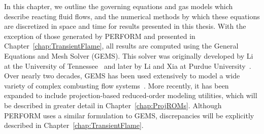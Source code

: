 
In this chapter, we outline the governing equations and gas models which describe reacting fluid flows, and the numerical methods by which these equations are discretized in space and time for results presented in this thesis. With the exception of those generated by PERFORM and presented in Chapter~\ref{chap:TransientFlame}, all results are computed using the General Equations and Mesh Solver (GEMS). This solver was originally developed by Li at the University of Tennessee~\cite{Li2001} and later by Li and Xia at Purdue University~\cite{Li2006}. Over nearly two decades, GEMS has been used extensively to model a wide variety of complex combusting flow systems~\cite{Xia2011,Huang2014,Comer2016}. More recently, it has been expanded to include projection-based reduced-order modeling utilities, which will be described in greater detail in Chapter~\ref{chap:ProjROMs}. Although PERFORM uses a similar formulation to GEMS, discrepancies will be explicitly described in Chapter~\ref{chap:TransientFlame}.